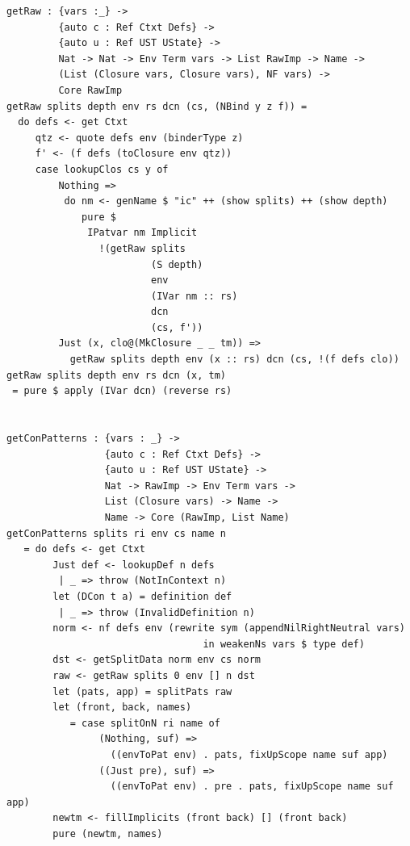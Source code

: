 \documentclass[a4paper]{article}
\begin{document}
\begin{center}
  \begin{verbatim}
getRaw : {vars :_} -> 
         {auto c : Ref Ctxt Defs} -> 
         {auto u : Ref UST UState} ->
         Nat -> Nat -> Env Term vars -> List RawImp -> Name ->
         (List (Closure vars, Closure vars), NF vars) ->
         Core RawImp
getRaw splits depth env rs dcn (cs, (NBind y z f)) =
  do defs <- get Ctxt
     qtz <- quote defs env (binderType z)
     f' <- (f defs (toClosure env qtz))
     case lookupClos cs y of 
         Nothing => 
          do nm <- genName $ "ic" ++ (show splits) ++ (show depth)  
             pure $
              IPatvar nm Implicit 
                !(getRaw splits
                         (S depth)
                         env
                         (IVar nm :: rs)
                         dcn
                         (cs, f'))
         Just (x, clo@(MkClosure _ _ tm)) =>
           getRaw splits depth env (x :: rs) dcn (cs, !(f defs clo))
getRaw splits depth env rs dcn (x, tm)
 = pure $ apply (IVar dcn) (reverse rs)


getConPatterns : {vars : _} ->
                 {auto c : Ref Ctxt Defs} -> 
                 {auto u : Ref UST UState} ->
                 Nat -> RawImp -> Env Term vars ->
                 List (Closure vars) -> Name -> 
                 Name -> Core (RawImp, List Name)
getConPatterns splits ri env cs name n
   = do defs <- get Ctxt
        Just def <- lookupDef n defs
         | _ => throw (NotInContext n)
        let (DCon t a) = definition def
         | _ => throw (InvalidDefinition n)
        norm <- nf defs env (rewrite sym (appendNilRightNeutral vars)
                                  in weakenNs vars $ type def)
        dst <- getSplitData norm env cs norm
        raw <- getRaw splits 0 env [] n dst
        let (pats, app) = splitPats raw 
        let (front, back, names)
           = case splitOnN ri name of
                (Nothing, suf) => 
                  ((envToPat env) . pats, fixUpScope name suf app)      
                ((Just pre), suf) => 
                  ((envToPat env) . pre . pats, fixUpScope name suf app)
        newtm <- fillImplicits (front back) [] (front back) 
        pure (newtm, names) 
  \end{verbatim}
\end{center}
\end{document}

